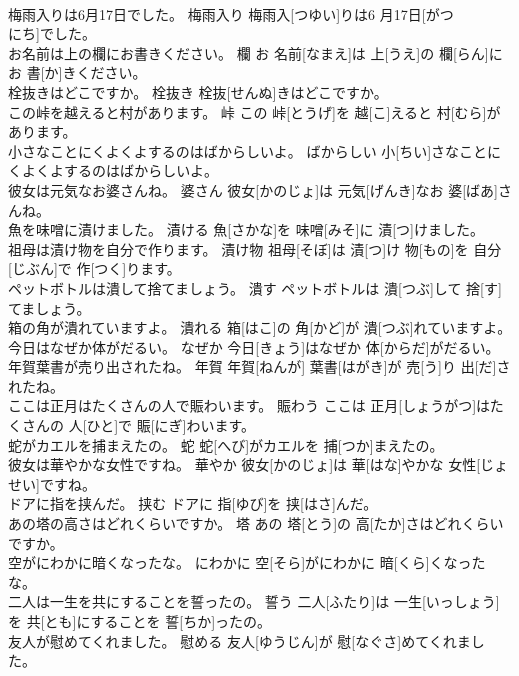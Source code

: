 \documentclass[8pt]{extreport}
\begin{document}
\begin{CJK}{UTF8}{min}
\\	梅雨入りは6月17日でした。	梅雨入り	梅雨入[つゆい]りは6 月17日[がつ 
\\	にち]でした。	
\\	お名前は上の欄にお書きください。	欄	お 名前[なまえ]は 上[うえ]の 欄[らん]にお 書[か]きください。	
\\	栓抜きはどこですか。	栓抜き	栓抜[せんぬ]きはどこですか。	
\\	この峠を越えると村があります。	峠	この 峠[とうげ]を 越[こ]えると 村[むら]があります。	
\\	小さなことにくよくよするのはばからしいよ。	ばからしい	小[ちい]さなことにくよくよするのはばからしいよ。	
\\	彼女は元気なお婆さんね。	婆さん	彼女[かのじょ]は 元気[げんき]なお 婆[ばあ]さんね。	
\\	魚を味噌に漬けました。	漬ける	魚[さかな]を 味噌[みそ]に 漬[つ]けました。	
\\	祖母は漬け物を自分で作ります。	漬け物	祖母[そぼ]は 漬[つ]け 物[もの]を 自分[じぶん]で 作[つく]ります。	
\\	ペットボトルは潰して捨てましょう。	潰す	ペットボトルは 潰[つぶ]して 捨[す]てましょう。	
\\	箱の角が潰れていますよ。	潰れる	箱[はこ]の 角[かど]が 潰[つぶ]れていますよ。	
\\	今日はなぜか体がだるい。	なぜか	今日[きょう]はなぜか 体[からだ]がだるい。	
\\	年賀葉書が売り出されたね。	年賀	年賀[ねんが] 葉書[はがき]が 売[う]り 出[だ]されたね。	
\\	ここは正月はたくさんの人で賑わいます。	賑わう	ここは 正月[しょうがつ]はたくさんの 人[ひと]で 賑[にぎ]わいます。	
\\	蛇がカエルを捕まえたの。	蛇	蛇[へび]がカエルを 捕[つか]まえたの。	
\\	彼女は華やかな女性ですね。	華やか	彼女[かのじょ]は 華[はな]やかな 女性[じょせい]ですね。	
\\	ドアに指を挟んだ。	挟む	ドアに 指[ゆび]を 挟[はさ]んだ。	
\\	あの塔の高さはどれくらいですか。	塔	あの 塔[とう]の 高[たか]さはどれくらいですか。	
\\	空がにわかに暗くなったな。	にわかに	空[そら]がにわかに 暗[くら]くなったな。	
\\	二人は一生を共にすることを誓ったの。	誓う	二人[ふたり]は 一生[いっしょう]を 共[とも]にすることを 誓[ちか]ったの。	
\\	友人が慰めてくれました。	慰める	友人[ゆうじん]が 慰[なぐさ]めてくれました。	

\end{CJK}
\end{document}

